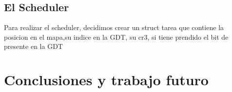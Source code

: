 \documentclass[a4paper]{article}
\newenvironment{codesnippet}{%
	\begin{Sbox}\begin{minipage}{\textwidth}\sffamily\small}%
	{\end{minipage}\end{Sbox}%
		\begin{center}%
		\vspace{-0.4cm}\colorbox{litegrey}{\TheSbox}\end{center}\vspace{0.3cm}}
\begin{document}
\subsection{El Scheduler}
Para realizar el scheduler, decidimos crear un struct tarea que contiene la posicion en el mapa,su indice en la GDT, su cr3, si tiene prendido el bit de presente en la GDT

\section{Conclusiones y trabajo futuro}






\end{document}
